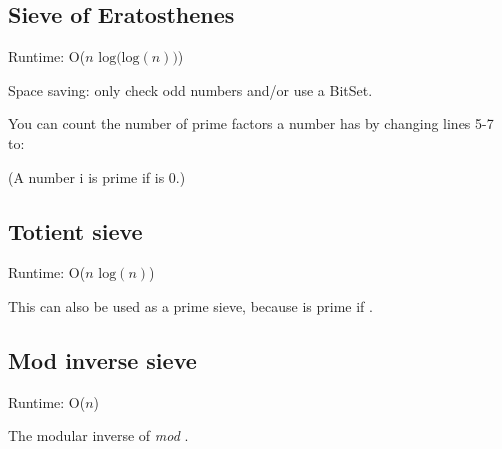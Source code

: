 
\subsection*{Sieve of Eratosthenes}

Runtime: O($n \text{ log(log} (n))$)

Space saving: only check odd numbers and/or use a BitSet.



You can count the number of prime factors a number has by changing lines 5-7 to:



(A number i is prime if  is 0.)

\subsection*{Totient sieve}

Runtime: O($n \text{ log}(n)$)

This can also be used as a prime sieve, because  is prime if .



\subsection*{Mod inverse sieve}

Runtime: O($n$)

The modular inverse of  \textit{mod} .



\newpage